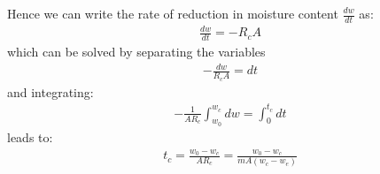 \documentclass[letterpaper,10pt,english]{jupyterBook}
\begin{document}
\sphinxAtStartPar
Hence we can write the rate of reduction in moisture content \(\frac{dw}{dt}\) as:
\begin{equation*}
\begin{split}
\frac{dw}{dt}=-R_cA
\end{split}
\end{equation*}
\sphinxAtStartPar
which can be solved by separating the variables
\begin{equation*}
\begin{split}
-\frac{dw}{R_cA}=dt
\end{split}
\end{equation*}
\sphinxAtStartPar
and integrating:
\begin{equation*}
\begin{split}
-\frac{1}{AR_c}\int_{w_0}^{w_c}dw=\int_{0}^{t_c}dt
\end{split}
\end{equation*}
\sphinxAtStartPar
leads to:
\begin{equation*}
\begin{split}
t_c=\frac{w_0-w_c}{AR_c}=\frac{w_0-w_c}{mA(w_c-w_e)}
\end{split}
\end{equation*}
\end{document}
